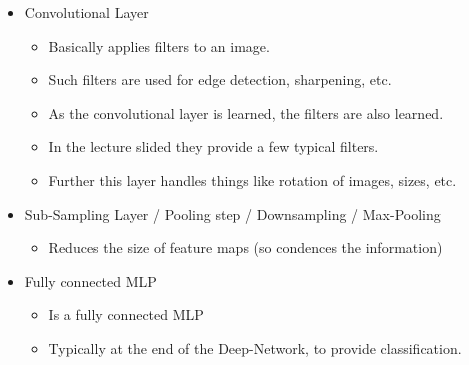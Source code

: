 \documentclass[12pt,a4paper]{article}
\begin{document}
\begin{itemize}
    \item Convolutional Layer
        \begin{itemize}
            \item Basically applies filters to an image.
            \item Such filters are used for edge detection, sharpening, etc.
            \item As the convolutional layer is learned, the filters are also learned.
            \item In the lecture slided they provide a few typical filters.
            \item Further this layer handles things like rotation of images, sizes, etc.
        \end{itemize}
    \item Sub-Sampling Layer / Pooling step / Downsampling / Max-Pooling 
        \begin{itemize}
            \item Reduces the size of feature maps (so condences the information)
        \end{itemize}
    \item Fully connected MLP
        \begin{itemize}
            \item Is a fully connected MLP
            \item Typically at the end of the Deep-Network, to provide classification.
        \end{itemize}
\end{itemize}
\end{document}
